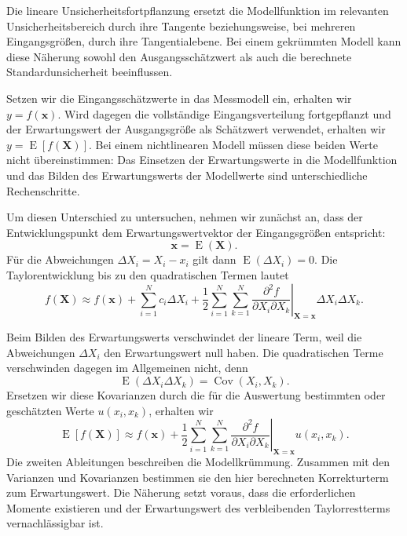 Die lineare Unsicherheitsfortpflanzung ersetzt die Modellfunktion
im relevanten Unsicherheitsbereich durch ihre Tangente
beziehungsweise, bei mehreren Eingangsgrößen, durch ihre
Tangentialebene. Bei einem gekrümmten Modell kann diese Näherung
sowohl den Ausgangsschätzwert als auch die berechnete
Standardunsicherheit beeinflussen.

Setzen wir die Eingangsschätzwerte in das Messmodell ein,
erhalten wir $y=f(\mathbf x)$. Wird dagegen die vollständige
Eingangsverteilung fortgepflanzt und der Erwartungswert der
Ausgangsgröße als Schätzwert verwendet, erhalten wir
$y=\operatorname E[f(\mathbf X)]$.
Bei einem nichtlinearen Modell müssen diese beiden Werte
nicht übereinstimmen: Das Einsetzen der Erwartungswerte
in die Modellfunktion und das Bilden des Erwartungswerts
der Modellwerte sind unterschiedliche Rechenschritte.

Um diesen Unterschied zu untersuchen, nehmen wir zunächst
an, dass der Entwicklungspunkt dem Erwartungswertvektor
der Eingangsgrößen entspricht:
\begin{equation}
\mathbf x=\operatorname E(\mathbf X).
\end{equation}
Für die Abweichungen $\Delta X_i=X_i-x_i$ gilt dann
$\operatorname E(\Delta X_i)=0$.
Die Taylorentwicklung bis zu den quadratischen Termen lautet
\begin{equation}
f(\mathbf X)\approx
f(\mathbf x)
+\sum_{i=1}^N c_i\Delta X_i
+\frac12\sum_{i=1}^N\sum_{k=1}^N
\left.
\frac{\partial^2 f}{\partial X_i\partial X_k}
\right|_{\mathbf X=\mathbf x}
\Delta X_i\Delta X_k.
\end{equation}

Beim Bilden des Erwartungswerts verschwindet der lineare Term,
weil die Abweichungen $\Delta X_i$ den Erwartungswert null haben.
Die quadratischen Terme verschwinden dagegen im Allgemeinen
nicht, denn
\begin{equation}
\operatorname E(\Delta X_i\Delta X_k)
=
\operatorname{Cov}(X_i,X_k).
\end{equation}
Ersetzen wir diese Kovarianzen durch die für die Auswertung
bestimmten oder geschätzten Werte $u(x_i,x_k)$, erhalten wir
\begin{equation}
\operatorname E[f(\mathbf X)]
\approx
f(\mathbf x)
+\frac12\sum_{i=1}^N\sum_{k=1}^N
\left.
\frac{\partial^2 f}{\partial X_i\partial X_k}
\right|_{\mathbf X=\mathbf x}
u(x_i,x_k).
\label{eq:ErwartungswertZweiteOrdnung10}
\end{equation}
Die zweiten Ableitungen beschreiben die Modellkrümmung.
Zusammen mit den Varianzen und Kovarianzen bestimmen sie
den hier berechneten Korrekturterm zum Erwartungswert.
Die Näherung setzt voraus, dass die erforderlichen Momente
existieren und der Erwartungswert des verbleibenden
Taylorrestterms vernachlässigbar ist.

